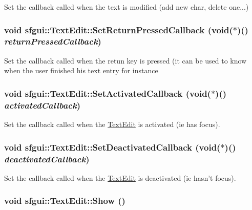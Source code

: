Set the callback called when the text is modified (add new char, delete one...) \hypertarget{classsfgui_1_1TextEdit_b60f88cc667196bb073091e8878483f4}{
\subsubsection[SetReturnPressedCallback]{\setlength{\rightskip}{0pt plus 5cm}void sfgui::TextEdit::SetReturnPressedCallback (void($\ast$)() {\em returnPressedCallback})}}
\label{classsfgui_1_1TextEdit_b60f88cc667196bb073091e8878483f4}




Set the callback called when the retun key is pressed (it can be used to know when the user finished his text entry for instance \hypertarget{classsfgui_1_1TextEdit_68bda298b3563eb960e77c3712664db8}{
\subsubsection[SetActivatedCallback]{\setlength{\rightskip}{0pt plus 5cm}void sfgui::TextEdit::SetActivatedCallback (void($\ast$)() {\em activatedCallback})}}
\label{classsfgui_1_1TextEdit_68bda298b3563eb960e77c3712664db8}




Set the callback called when the \hyperlink{classsfgui_1_1TextEdit}{TextEdit} is activated (ie has focus). \hypertarget{classsfgui_1_1TextEdit_6d75bcac8949d08513caa72e898e9b43}{
\subsubsection[SetDeactivatedCallback]{\setlength{\rightskip}{0pt plus 5cm}void sfgui::TextEdit::SetDeactivatedCallback (void($\ast$)() {\em deactivatedCallback})}}
\label{classsfgui_1_1TextEdit_6d75bcac8949d08513caa72e898e9b43}




Set the callback called when the \hyperlink{classsfgui_1_1TextEdit}{TextEdit} is deactivated (ie hasn't focus). \hypertarget{classsfgui_1_1TextEdit_1ee03247816213b34caaff365b160de0}{
\subsubsection[Show]{\setlength{\rightskip}{0pt plus 5cm}void sfgui::TextEdit::Show ()}}
\label{classsfgui_1_1TextEdit_1ee03247816213b34caaff365b160de0}




